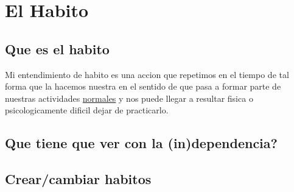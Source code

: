 \chapter{El Habito}
\section{ Que es el habito }
Mi entendimiento de habito es una accion que repetimos en el tiempo \cite{lally2010habits} de tal forma que la hacemos nuestra en el sentido de que pasa a formar parte de nuestras actividades \underline{normales} y nos puede llegar a resultar fisica o psicologicamente dificil dejar de practicarlo. 
\section{ Que tiene que ver con la (in)dependencia?}
\section{ Crear/cambiar habitos}

